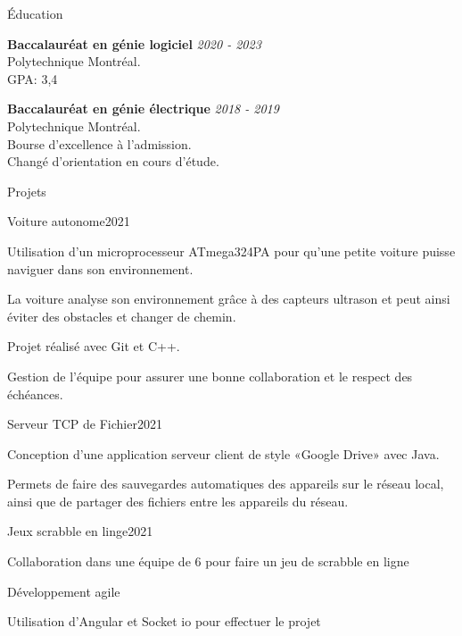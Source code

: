 \documentclass[french,12pt]{resume} %
\begin{document}
	\begin{rSection}{Éducation}
		
		{\bf Baccalauréat en génie logiciel} \hfill {\em  2020 - 2023} 
		\\ Polytechnique Montréal.
		\\GPA: 3,4 
		
		
		{\bf Baccalauréat en génie électrique} \hfill {\em  2018 - 2019} 
		\\ Polytechnique Montréal.
		\\ Bourse d'excellence à l'admission.
		\\ Changé d'orientation en cours d'étude.
		
	\end{rSection}
	
	
	\begin{rSection}{Projets}

		 \begin{rSubsection}{Voiture autonome}{2021}{}{}
			\item Utilisation d'un microprocesseur ATmega324PA pour qu'une petite voiture puisse naviguer dans son environnement.
			\item La voiture analyse son environnement grâce à des capteurs ultrason et peut ainsi éviter des obstacles et changer de chemin.
			\item Projet réalisé avec Git et C++.
			\item Gestion de l'équipe pour assurer une bonne collaboration et le respect des échéances.
			 
		 \end{rSubsection}


		\begin{rSubsection}{Serveur TCP de Fichier}{2021}{}{}
			\item Conception d'une application serveur client de style «Google Drive» avec Java.
			\item Permets de faire des sauvegardes automatiques des appareils sur le réseau local, ainsi que de partager des fichiers entre les appareils du réseau.
		\end{rSubsection}
		\begin{rSubsection}{Jeux scrabble en linge}{2021}{}{}
			\item   Collaboration dans une équipe de 6 pour faire un jeu de scrabble en ligne
			\item Développement agile
			\item Utilisation d'Angular et Socket io pour effectuer le projet
		\end{rSubsection}
		
	\end{rSection}
	
\end{document}
